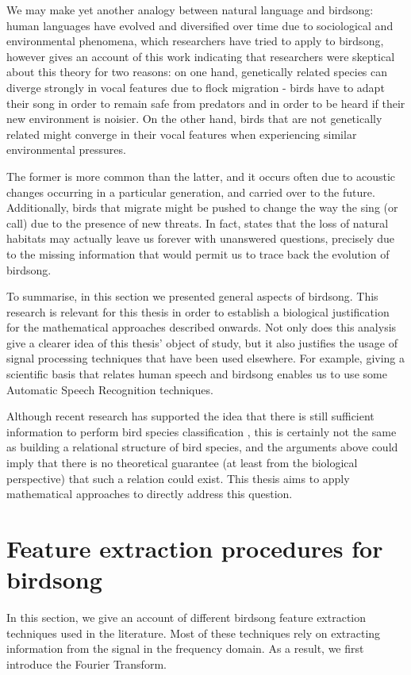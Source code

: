 \documentclass[../main.tex]{subfiles} \label{chapter_soa}
\begin{document}
\par We may make yet another analogy between natural language and birdsong: human languages have evolved and diversified over time due to sociological and environmental phenomena, which researchers have tried to apply to birdsong, however \cite{Cate2004} gives an account of this work indicating that researchers were skeptical about this theory for two reasons: on one hand, genetically related species can diverge strongly in vocal features due to flock migration - birds have to adapt their song in order to remain safe from predators and in order to be heard if their new environment is noisier. On the other hand, birds that are not genetically related might converge in their vocal features when experiencing similar environmental pressures.
\par The former is more common than the latter, and it occurs often due to acoustic changes occurring in a particular generation, and carried over to the future. Additionally, birds that migrate might be pushed to change the way the sing (or call) due to the presence of new threats. In fact, \cite{Marler2004} states that the loss of natural habitats may actually leave us forever with unanswered questions, precisely due to the missing information that would permit us to trace back the evolution of birdsong.
\par To summarise, in this section we presented general aspects of birdsong. This research is relevant for this thesis in order to establish a biological justification for the mathematical approaches described onwards. Not only does this analysis give a clearer idea of this thesis' object of study, but it also justifies the usage of signal processing techniques that have been used elsewhere. For example, giving a scientific basis that relates human speech and birdsong enables us to use some Automatic Speech Recognition techniques.
\par Although recent research has supported the idea that there is still sufficient information to perform bird species classification \cite{Naguib2014}, this is certainly not the same as building a relational structure of bird species, and the arguments above could imply that there is no theoretical guarantee (at least from the biological perspective) that such a relation could exist. This thesis aims to apply mathematical approaches to directly address this question.

\section{Feature extraction procedures for birdsong} \label{features_review}
In this section, we give an account of different birdsong feature extraction techniques used in the literature. Most of these techniques rely on extracting information from the signal in the frequency domain. As a result, we first introduce the Fourier Transform.
\end{document}
